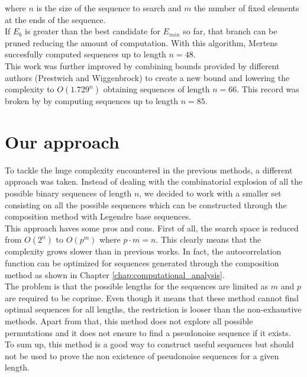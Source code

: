   where $n$ is the size of the sequence to search and $m$ the number of fixed
  elements at the ends of the sequence.\\

  If $E_b$ is greater than the best candidate for $E_{min}$ so far, that branch
  can be pruned reducing the amount of computation. With this algorithm,
  Mertens succesfully computed sequences up to length $n = 48$.\\

  This work was further improved by \citet{Packebusch_2016} combining bounds provided by different authors (Prestwich and
  Wiggenbrock) to create a new bound and  lowering the
  complexity to $O(1.729^n)$ obtaining sequences of length  $n= 66$. This
  record was broken by \citet{anatoli} by computing sequences up to length $n = 85$.\\

  \section{Our approach}

  To tackle the huge complexity encountered in the previous methods, a different
  approach was taken. Instead of dealing with the combinatorial explosion
  of all the possible binary sequences of length $n$, we decided to work with
  a smaller set consisting on all the possible sequences which can be
  constructed through the composition method with Legendre base sequences.\\

  This approach haves some pros and cons. First of all, the search space is
  reduced from $O(2^n)$ to $O(p^m)$ where $p \cdot m = n$. This clearly means that
  the complexity grows slower than in previous works. In fact, the
  autocorrelation function can be optimized for sequences generated through the
  composition method as shown in Chapter \ref{chap:computational_analysis}.\\

  The problem is that the possible lengths for the sequences are limited as $m$
  and $p$ are required to be coprime. Even though it means that
  these method cannot find optimal sequences for all lengths, the restriction is
  looser than the non-exhaustive methods. Apart from that, this method does not
  explore all possible permutations and it does not ensure to find a pseudonoise
  sequence if it exists. To sum up, this method is a good way to construct useful
  sequences but should not be used to prove the non existence of pseudonoise
  sequences for a given length.\\


